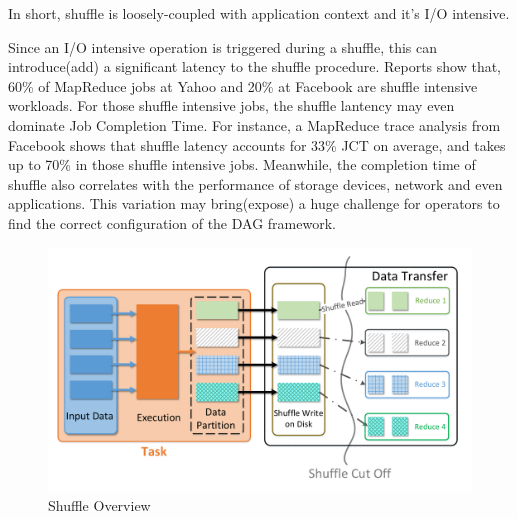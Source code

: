 In short, shuffle is loosely-coupled with application context and it's I/O intensive.

Since an I/O intensive operation is triggered during a shuffle, this can introduce(add) a significant latency to the shuffle procedure. Reports show that, 60\% of MapReduce jobs at Yahoo
and 20\% at Facebook are shuffle intensive workloads\cite{shufflewatcher}. For those shuffle intensive jobs, the shuffle lantency may even dominate Job Completion Time. 
For instance, a MapReduce trace analysis from Facebook shows that shuffle latency accounts for 33\% JCT on average, and takes up to 70\% in those shuffle intensive jobs\cite{managing}.
Meanwhile, the completion time of shuffle also correlates with the performance of storage devices, network and even applications. 
This variation may bring(expose) a huge challenge for operators to find the correct configuration of the DAG framework.
\begin{figure}
	\centering
	\includegraphics[width=\linewidth]{fig/shuffle_process}
	\caption{Shuffle Overview}
	\label{fig:shuffle_process}
\end{figure}

